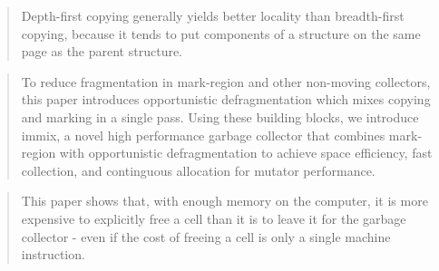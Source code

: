\documentclass[a4paper,oneside]{memoir}
\begin{document}
\blockquote{Depth-first copying generally yields better locality than
breadth-first copying, because it tends to put components of a structure on the
same page as the parent structure.}
\cite{Moon:1984}

\cite{Blackburn:2004}

\blockquote{To reduce fragmentation in mark-region and other non-moving
collectors, this paper introduces opportunistic defragmentation which mixes
copying and marking in a single pass. Using these building blocks, we introduce
immix, a novel high performance garbage collector that combines mark-region with
opportunistic defragmentation to achieve space efficiency, fast collection, and
continguous allocation for mutator performance.\cite{Blackburn:2008}}

\blockquote{This paper shows that, with enough memory on the computer, it is
more expensive to explicitly free a cell than it is to leave it for the garbage
collector - even if the cost of freeing a cell is only a single machine
instruction.}
\cite{Appel:1987}





\end{document}

